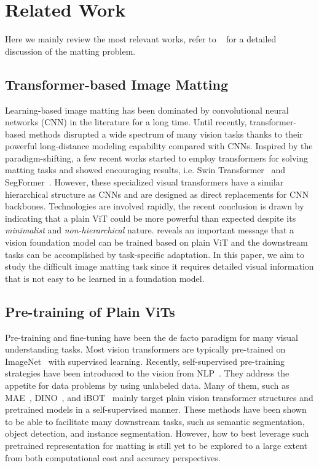 \documentclass[10pt,twocolumn,letterpaper]{article}
\begin{document}
\section{Related Work}
Here we mainly review the most relevant works, refer to ~\cite{matting_survey, rvm, matteformer} for a detailed discussion of the matting problem.


\subsection{Transformer-based Image Matting}
Learning-based image matting has been dominated by convolutional neural networks (CNN) in the literature \cite{DIM, CAM, HAttMatting, GCAMatting, MGM, Tang_2019_CVPR, Zhang_2019_CVPR, rvm, Lin_2022_WACV, Wang_2021_ICCV} for a long time. Until recently, transformer-based \cite{attention,vit} methods disrupted a wide spectrum of many vision tasks thanks to their powerful long-distance modeling capability compared with CNNs. Inspired by the paradigm-shifting, a few recent works started to employ transformers for solving matting tasks \cite{matteformer, rmat, transmatting} and showed encouraging results, i.e. Swin Transformer~\cite{swin} and SegFormer~\cite{segformer}. However, these specialized visual transformers have a similar hierarchical structure as CNNs and are designed as direct replacements for CNN backbones. Technologies are involved rapidly, the recent conclusion is drawn by \cite{vitdet} indicating that a plain ViT could be more powerful than expected despite its \emph{minimalist} and \emph{non-hierarchical} nature. \cite{vitdet} reveals an important message that a vision foundation model \cite{bommasani2021opportunities} can be trained based on plain ViT and the downstream tasks can be accomplished by task-specific adaptation. In this paper, we aim to study the difficult image matting task since it requires detailed visual information that is not easy to be learned in a foundation model.


\subsection{Pre-training of Plain ViTs}
Pre-training and fine-tuning have been the de facto paradigm for many visual understanding tasks. Most vision transformers are typically pre-trained on ImageNet~\cite{deng2009imagenet} with supervised learning. Recently, self-supervised pre-training strategies have been introduced to the vision from NLP~\cite{devlin2018bert, radford2019language, brown2020language, radford2018improving}. They address the appetite for data problems by using unlabeled data. Many of them, such as MAE~\cite{he2022masked}, DINO~\cite{dino}, and iBOT~\cite{ibot} mainly target plain vision transformer structures and pretrained models in a self-supervised manner. These methods have been shown to be able to facilitate many downstream tasks, such as semantic segmentation, object detection, and instance segmentation. However, how to best leverage such pretrained representation for matting is still yet to be explored to a large extent from both computational cost and accuracy perspectives.
\end{document}
